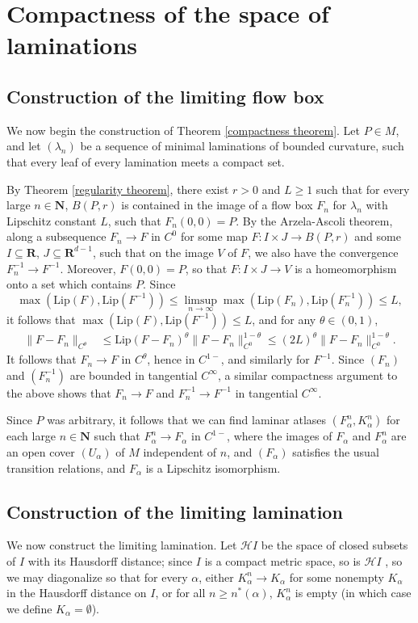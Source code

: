 \documentclass[reqno,11pt]{amsart}
\newcommand{\NN}{\mathbf{N}}
\newcommand{\RR}{\mathbf{R}}
\newcommand{\Hypspace}{\mathscr H}
\newcommand{\Lip}{\mathrm{Lip}}
\theoremstyle{definition}
\numberwithin{equation}{section}
\begin{document}
\section{Compactness of the space of laminations}\label{CompactnessSec}
\subsection{Construction of the limiting flow box}
We now begin the construction of Theorem \ref{compactness theorem}.
Let $P \in M$, and let $(\lambda_n)$ be a sequence of minimal laminations of bounded curvature, such that every leaf of every lamination meets a compact set.

By Theorem \ref{regularity theorem}, there exist $r > 0$ and $L \geq 1$ such that for every large $n \in \NN$, $B(P, r)$ is contained in the image of a flow box $F_n$ for $\lambda_n$ with Lipschitz constant $L$, such that $F_n(0, 0) = P$.
By the Arzela-Ascoli theorem, along a subsequence $F_n \to F$ in $C^0$ for some map $F: I \times J \to B(P, r)$ and some $I \subseteq \RR$, $J \subseteq \RR^{d - 1}$, such that on the image $V$ of $F$, we also have the convergence $F_n^{-1} \to F^{-1}$.
Moreover, $F(0, 0) = P$, so that $F: I \times J \to V$ is a homeomorphism onto a set which contains $P$.
Since
$$\max(\Lip(F), \Lip(F^{-1})) \leq \limsup_{n \to \infty} \max(\Lip(F_n), \Lip(F_n^{-1})) \leq L,$$
it follows that $\max(\Lip(F), \Lip(F^{-1})) \leq L$, and for any $\theta \in (0, 1)$,
\begin{align*}
	\|F - F_n\|_{C^\theta}
	&\leq \Lip(F - F_n)^\theta \|F - F_n\|_{C^0}^{1 - \theta} \leq (2L)^\theta \|F - F_n\|_{C^0}^{1 - \theta}.
\end{align*}
It follows that $F_n \to F$ in $C^\theta$, hence in $C^{1-}$, and similarly for $F^{-1}$.
Since $(F_n)$ and $(F_n^{-1})$ are bounded in tangential $C^\infty$, a similar compactness argument to the above shows that $F_n \to F$ and $F_n^{-1} \to F^{-1}$ in tangential $C^\infty$.

Since $P$ was arbitrary, it follows that we can find laminar atlases $(F_\alpha^n, K_\alpha^n)$ for each large $n \in \NN$ such that $F_\alpha^n \to F_\alpha$ in $C^{1-}$, where the images of $F_\alpha$ and $F_\alpha^n$ are an open cover $(U_\alpha)$ of $M$ independent of $n$, and $(F_\alpha)$ satisfies the usual transition relations, and $F_\alpha$ is a Lipschitz isomorphism.

\subsection{Construction of the limiting lamination}
We now construct the limiting lamination.
Let $\Hypspace I$ be the space of closed subsets of $I$ with its Hausdorff distance; since $I$ is a compact metric space, so is $\Hypspace I$ \cite[Theorem 4.17]{nadler2017continuum}, so we may diagonalize so that for every $\alpha$, either $K^n_\alpha \to K_\alpha$ for some nonempty $K_\alpha$ in the Hausdorff distance on $I$, or for all $n \geq n^*(\alpha)$, $K_\alpha^n$ is empty (in which case we define $K_\alpha = \emptyset$).
\end{document}
